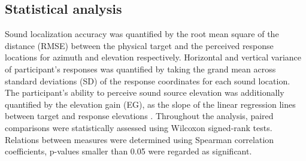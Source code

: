 \subsection{Statistical analysis}
Sound localization accuracy was quantified by the root mean square of the distance (RMSE) between the physical target and the perceived response locations for azimuth and elevation respectively. Horizontal and vertical variance of participant’s responses was quantified by taking the grand mean across standard deviations (SD) of the response coordinates for each sound location. The participant’s ability to perceive sound source elevation was additionally quantified by the elevation gain (EG), as the slope of the linear regression lines between target and response elevations \citep{hofman_relearning_1998}. Throughout the analysis, paired comparisons were statistically assessed using Wilcoxon signed-rank tests. Relations between measures were determined using Spearman correlation coefficients, p-values smaller than 0.05 were regarded as significant.
